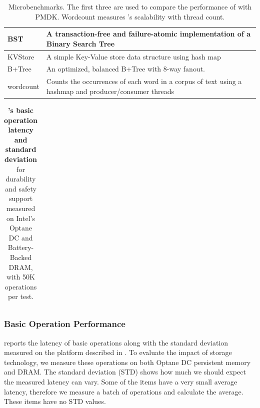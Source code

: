 \begin{table}
      \center
      \footnotesize
    \begin{tabular}{|p{0.5in}|p{2.5in}|}
        \hline
        BST & A transaction-free and failure-atomic implementation of a Binary Search Tree \\ \hline
        KVStore & A simple Key-Value store data structure using hash map \\ \hline
        B+Tree & An optimized, balanced B+Tree with 8-way fanout.  \\ \hline
        wordcount & Counts the occurrences of each word in a corpus of text using a hashmap and producer/consumer threads\\\hline
    \end{tabular}
    \caption{Microbenchmarks. The first three are used to compare the performance of \this{} with PMDK. Wordcount measures \this{}'s scalability with thread count.}
    \label{tab:perf:wrkld}
\end{table}


\begin{table}
  \center
  \footnotesize
  \begin{tabular}{|l||l|l||l|l|}\hline
    
  \end{tabular}
  \caption{\textbf{\This's basic operation latency and standard deviation} for durability and safety support measured on Intel's Optane DC and Battery-Backed DRAM, with 50K operations per test.}
  \label{tab:microbench}
\end{table}

\subsubsection{Basic Operation Performance}

 reports the latency of basic operations along with the standard deviation measured on the platform described in . To evaluate the impact of storage technology, we measure these operations on both Optane DC persistent memory and DRAM. The standard deviation (STD) shows how much we should expect the measured latency can vary. Some of the items have a very small average latency, therefore we measure a batch of operations and calculate the average. These items have no STD values.

